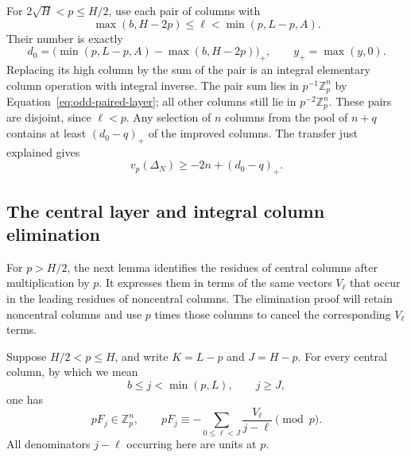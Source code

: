 For $2\sqrt H<p\le H/2$, use each pair of columns with
\[
 \max(b,H-2p)\le\ell<\min(p,L-p,A).
\]
Their number is exactly
\[
 d_0=\bigl(\min(p,L-p,A)-\max(b,H-2p)\bigr)_+,
 \qquad y_+=\max(y,0).
\]
Replacing its high column by the sum of the pair is an integral
elementary column operation with integral inverse.  The pair sum lies
in $p^{-1}\mathbb Z_p^n$ by Equation~\eqref{eq:odd-paired-layer}; all
other columns still lie in $p^{-2}\mathbb Z_p^n$.  These pairs are
disjoint, since $\ell<p$.  Any selection of $n$ columns from the pool
of $n+q$ contains at least $(d_0-q)_+$ of the improved columns.
The transfer just explained gives
\begin{equation}\label{eq:odd-lower-pair-range}
 v_p(\Delta_N)\ge-2n+(d_0-q)_+.
\end{equation}

\subsection{The central layer and integral column elimination}

For $p>H/2$, the next lemma identifies the residues of central columns
after multiplication by $p$.  It expresses them in terms of the same
vectors $V_\ell$ that occur in the leading residues of noncentral
columns.  The elimination proof will retain noncentral columns and use
$p$ times those columns to cancel the corresponding $V_\ell$ terms.
\begin{lemma}\label{lem:odd-central-layer}
Suppose $H/2<p\le H$, and write
$K=L-p$ and $J=H-p$.  For every central column, by which we mean
\[
 b\le j<\min(p,L),\qquad j\ge J,
\]
one has
\begin{equation}\label{eq:central-layer}
 pF_j\in\mathbb Z_p^n,\qquad
 pF_j\equiv-\sum_{0\le\ell<J}\frac{V_\ell}{j-\ell}\pmod p.
\end{equation}
All denominators $j-\ell$ occurring here are units at $p$.
\end{lemma}

